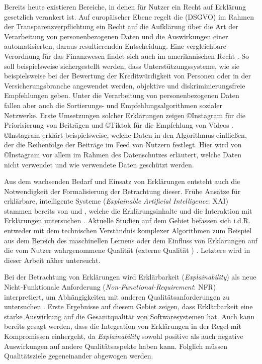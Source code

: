 Bereits heute existieren Bereiche, in denen für Nutzer ein \glqq Recht auf Erklärung\grqq{} gesetzlich verankert ist. Auf europäischer Ebene regelt die  (DSGVO) \cite{eu_verordnung_2016} im Rahmen der Transparenzverpflichtung ein Recht auf die Aufklärung über die Art der Verarbeitung von personenbezogenen Daten und die Auswirkungen einer automatisierten, daraus resultierenden Entscheidung. Eine vergleichbare Verordnung für das Finanzwesen findet sich auch im amerikanischen Recht \cite{cfpb_regulation_2018}. So soll beispielsweise sichergestellt werden, dass Unterstützungssysteme, wie sie beispielsweise bei der Bewertung der Kreditwürdigkeit von Personen oder in der Versicherungsbranche angewendet werden, objektive und diskriminierungsfreie Empfehlungen geben. Unter die Verarbeitung von personenbezogenen Daten fallen aber auch die Sortierungs- und Empfehlungsalgorithmen sozialer Netzwerke. Erste Umsetzungen solcher Erklärungen zeigen \copyright Instagram für die Priorisierung von Beiträgen und \copyright Tiktok für die Empfehlung von Videos \cite{mosseri_shedding_2021,tiktok_technology_limited_how_2021}. \copyright Instagram erklärt beispielsweise, welche Daten in den Algorithmus einfließen, der die Reihenfolge der Beiträge im Feed von Nutzern festlegt. Hier wird von \copyright Instagram vor allem im Rahmen des Datenschutzes erläutert, welche Daten nicht verwendet und wie verwendete Daten geschützt werden.

Aus dem wachsenden Bedarf und Einsatz von Erklärungen entsteht auch die Notwendigkeit der Formalisierung der Betrachtung dieser. Frühe Ansätze für erklärbare, intelligente Systeme (\textit{Explainable Artificial Intelligence}: XAI) stammen bereits von \citeauthor{byrne1991construction} und \citeauthor{cawsey1991generating}, welche die Erklärungsinhalte \cite{byrne1991construction} und die Interaktion mit Erklärungen untersuchen \cite{cawsey1991generating}. Aktuelle Studien auf dem Gebiet befassen sich i.d.R. entweder mit dem technischen Verständnis komplexer Algorithmen zum Beispiel aus dem Bereich des maschinellen Lernens \cite{gilpin_explaining_2018, fong_interpretable_2017, samek_towards_2019} oder dem Einfluss von Erklärungen auf die vom Nutzer wahrgenommene Qualität (externe Qualität \cite{international2011iso}) \cite{nunes_systematic_2017,kouki_user_2017,chazette_end-users_nodate}. Letztere wird in dieser Arbeit näher untersucht.

Bei der Betrachtung von Erklärungen wird Erklärbarkeit (\textit{Explainability}) als neue Nicht-Funktionale Anforderung (\textit{Non-Functional-Requirement}: NFR) interpretiert, um Abhängigkeiten mit anderen Qualitätsanforderungen zu untersuchen \cite{kohl_explainability_2019, chazette2020explainability}. Erste Ergebnisse auf diesem Gebiet zeigen, dass Erklärbarkeit eine starke Auswirkung auf die Gesamtqualität von Softwaresystemen hat. Auch kann bereits gesagt werden, dass die Integration von Erklärungen in der Regel mit Kompromissen einhergeht, da \textit{Explainability} sowohl positive als auch negative Auswirkungen auf andere Qualitätsaspekte haben kann. Folglich müssen Qualitätsziele gegeneinander abgewogen werden.

